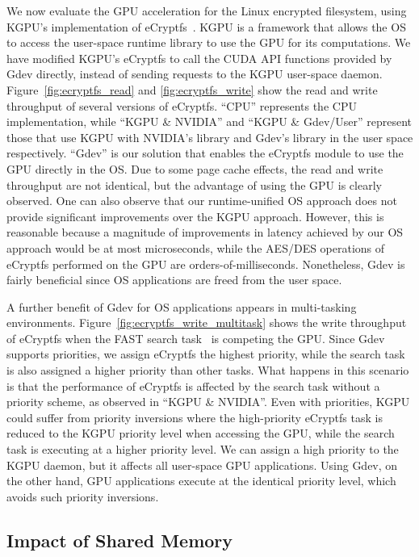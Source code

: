 We now evaluate the GPU acceleration for the Linux encrypted filesystem,
using KGPU's implementation of eCryptfs~\cite{Sun_SECURITY11_Poster}.
KGPU is a framework that allows the OS to access the user-space runtime
library to use the GPU for its computations.
We have modified KGPU's eCryptfs to call the CUDA API functions
provided by Gdev directly, instead of sending requests to the KGPU user-space
daemon.
Figure~\ref{fig:ecryptfs_read} and \ref{fig:ecryptfs_write} show the
read and write throughput of several versions of eCryptfs.
``CPU'' represents the CPU implementation, while ``KGPU \& NVIDIA'' and
``KGPU \& Gdev/User'' represent those that use KGPU with NVIDIA's
library and Gdev's library in the user space respectively.
``Gdev'' is our solution that enables the eCryptfs module to use the GPU
directly in the OS.
Due to some page cache effects, the read and write throughput are not
identical, but the advantage of using the GPU is clearly observed.
One can also observe that our runtime-unified OS approach does not
provide significant improvements over the KGPU approach.
However, this is reasonable because a magnitude of improvements in
latency achieved by our OS approach would be at most microseconds, while
the AES/DES operations of eCryptfs performed on the GPU are
orders-of-milliseconds.
Nonetheless, Gdev is fairly beneficial since OS applications are freed
from the user space.

A further benefit of Gdev for OS applications appears in multi-tasking
environments.
Figure~\ref{fig:ecryptfs_write_multitask} shows the write throughput of
eCryptfs when the FAST search task~\cite{Kim_SIGMOD10} is competing
the GPU.
Since Gdev supports priorities, we assign eCryptfs the highest priority,
while the search task is also assigned a higher priority than other tasks.
What happens in this scenario is that the performance of eCryptfs is
affected by the search task without a priority scheme, as observed in
``KGPU \& NVIDIA''.
Even with priorities, KGPU could suffer from priority inversions where
the high-priority eCryptfs task is reduced to the KGPU priority level
when accessing the GPU, while the search task is executing at a
higher priority level.
We can assign a high priority to the KGPU daemon, but it affects all
user-space GPU applications.
Using Gdev, on the other hand, GPU applications execute at the identical
priority level, which avoids such priority inversions.

\vspace{-0.25em}
\subsection{Impact of Shared Memory}
\vspace{-0.25em}


